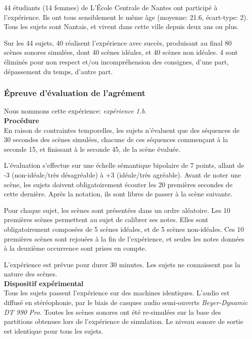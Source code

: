 44 étudiants (14 femmes) de L’École Centrale de Nantes ont participé à l'expérience. Ils ont tous sensiblement le même âge (moyenne: 21.6, écart-type: 2). Tous les sujets sont Nantais, et vivent dans cette ville depuis deux ans ou plus.

Sur les 44 sujets, 40 réalisent l'expérience avec succès, produisant au final 80 scènes sonores simulées, dont 40 scènes idéales, et 40 scènes non idéales. 4 sont éliminés pour non respect et/ou incompréhension des consignes, d'une part, dépassement du temps, d'autre part.

\subsubsection{Épreuve d'évaluation de l'agrément}
\label{sec:ch5_planExpEvaA}

Nous nommons cette expérience: \emph{expérience 1.b}. \\

{\setlength{\parindent}{0cm}\textbf{Procédure}} \\

En raison de contraintes temporelles, les sujets n'évaluent que des séquences de 30 secondes des scènes simulées, chacune de ces séquences commençant à la seconde 15, et finissant à le seconde 45, de la scène évaluée.

L'évaluation s'effectue sur une échelle sémantique bipolaire de 7 points, allant de -3 (non-idéale/très désagréable) à +3 (idéale/très agréable). Avant de noter une scène, les sujets doivent obligatoirement écouter les 20 premières secondes de cette dernière. Après la notation, ils sont libres de passer à la scène suivante.

Pour chaque sujet, les scènes sont présentées dans un ordre aléatoire. Les 10 premières scènes permettent au sujet de calibrer ses notes. Elles sont obligatoirement composées de 5 scènes idéales, et de 5 scènes non-idéales. Ces 10 premières scènes sont rejouées à la fin de l'expérience, et seules les notes données à la deuxième occurrence sont prises en compte. 

L'expérience est prévue pour durer 30 minutes. Les sujets ne connaissent pas la nature des scènes.\\

{\setlength{\parindent}{0cm}\textbf{Dispositif expérimental}} \\

Tous les sujets passent l'expérience sur des machines identiques. L'audio est diffusé en stéréophonie, par le biais de casques audio semi-ouverts \emph{Beyer-Dynamic DT 990 Pro}. Toutes les scènes sonores ont été re-simulées sur la base des partitions obtenues lors de l'expérience de simulation. Le niveau sonore de sortie est identique pour tous les sujets.


